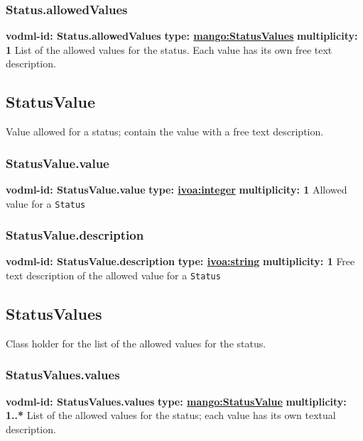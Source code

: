     \subsubsection{Status.allowedValues}
      \textbf{vodml-id: Status.allowedValues} \newline
      \textbf{type: \hyperref[sect:StatusValues]{mango:StatusValues}} \newline
      \textbf{multiplicity: 1} \newline
      List of the allowed values for the status. Each value has its own free text description.

  \subsection{StatusValue}
  \label{sect:StatusValue}
    Value allowed for a status; contain the value with a free text description.

    \subsubsection{StatusValue.value}
      \textbf{vodml-id: StatusValue.value} \newline
      \textbf{type: \hyperref[sect:ivoa]{ivoa:integer}} \newline
      \textbf{multiplicity: 1} \newline
      Allowed value for a \texttt{Status}

    \subsubsection{StatusValue.description}
      \textbf{vodml-id: StatusValue.description} \newline
      \textbf{type: \hyperref[sect:ivoa]{ivoa:string}} \newline
      \textbf{multiplicity: 1} \newline
      Free text description of the allowed value for a \texttt{Status}

  \subsection{StatusValues}
  \label{sect:StatusValues}
    Class holder for the list of the allowed values for the status.

    \subsubsection{StatusValues.values}
      \textbf{vodml-id: StatusValues.values} \newline
      \textbf{type: \hyperref[sect:StatusValue]{mango:StatusValue}} \newline
      \textbf{multiplicity: 1..*} \newline
      List of the allowed values for the status; each value has its own textual description.


